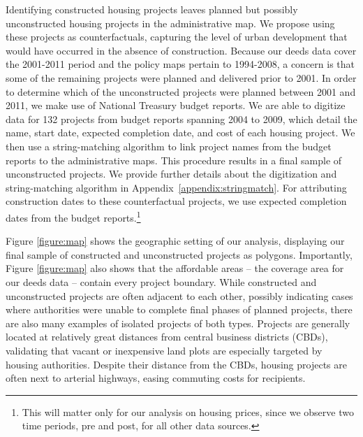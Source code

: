 \documentclass[12pt]{article}
\begin{document}
Identifying constructed housing projects leaves planned but possibly unconstructed housing projects in the administrative map.  We propose using these projects as counterfactuals, capturing the level of urban development that would have occurred in the absence of construction. Because our deeds data cover the 2001-2011 period and the policy maps pertain to 1994-2008, a concern is that some of the remaining projects were planned and delivered prior to 2001. In order to determine which of the unconstructed projects were planned between 2001 and 2011, we make use of National Treasury budget reports.  We are able to digitize data for 132 projects from budget reports spanning 2004 to 2009, which detail the name, start date, expected completion date, and cost of each housing project.  We then use a string-matching algorithm to link project names from the budget reports to the administrative maps. This procedure results in a final sample of unconstructed projects. We provide further details about the digitization and string-matching algorithm in Appendix~\ref{appendix:stringmatch}. For attributing construction dates to these counterfactual projects,  we use expected completion dates from the budget reports.\footnote{This will matter only for our analysis on housing prices, since we observe two time periods, pre and post, for all other data sources. }

Figure \ref{figure:map} shows the geographic setting of our analysis, displaying our final sample of constructed and unconstructed projects as polygons. Importantly, Figure \ref{figure:map} also shows that the affordable areas -- the coverage area for our deeds data -- contain every project boundary. While constructed and unconstructed projects are often adjacent to each other, possibly indicating cases where authorities were unable to complete final phases of planned projects, there are also many examples of isolated projects of both types.  Projects are generally located at relatively great distances from central business districts (CBDs), validating that vacant or inexpensive land plots are especially targeted by housing authorities.  Despite their distance from the CBDs, housing projects are often next to arterial highways, easing commuting costs for recipients.
\end{document}
